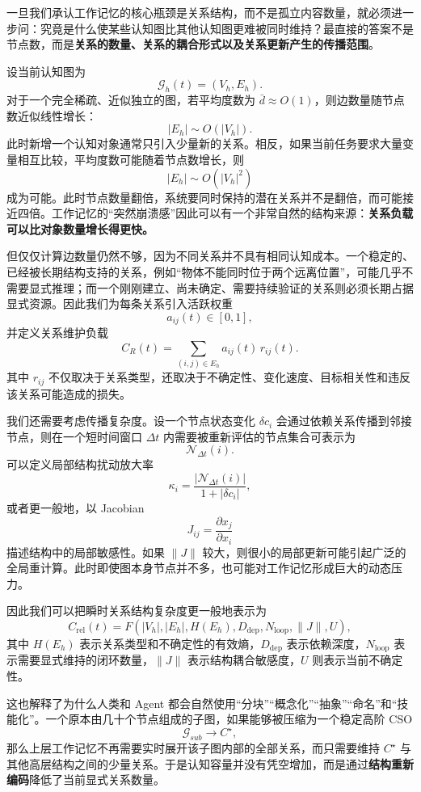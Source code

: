 一旦我们承认工作记忆的核心瓶颈是关系结构，而不是孤立内容数量，就必须进一步问：究竟是什么使某些认知图比其他认知图更难被同时维持？最直接的答案不是节点数，而是\textbf{关系的数量、关系的耦合形式以及关系更新产生的传播范围}。

设当前认知图为
\[
\mathcal{G}_h(t)=
\left(V_h,E_h\right).
\]
对于一个完全稀疏、近似独立的图，若平均度数为 $\bar d\approx O(1)$，则边数量随节点数近似线性增长：
\[
|E_h|
\sim
O(|V_h|).
\]
此时新增一个认知对象通常只引入少量新的关系。相反，如果当前任务要求大量变量相互比较，平均度数可能随着节点数增长，则
\[
|E_h|
\sim
O(|V_h|^2)
\]
成为可能。此时节点数量翻倍，系统要同时保持的潜在关系并不是翻倍，而可能接近四倍。工作记忆的“突然崩溃感”因此可以有一个非常自然的结构来源：\textbf{关系负载可以比对象数量增长得更快。}

但仅仅计算边数量仍然不够，因为不同关系并不具有相同认知成本。一个稳定的、已经被长期结构支持的关系，例如“物体不能同时位于两个远离位置”，可能几乎不需要显式推理；而一个刚刚建立、尚未确定、需要持续验证的关系则必须长期占据显式资源。因此我们为每条关系引入活跃权重
\[
a_{ij}(t)\in[0,1],
\]
并定义关系维护负载
\[
C_R(t)
=
\sum_{(i,j)\in E_h}
a_{ij}(t)\,r_{ij}(t).
\]
其中 $r_{ij}$ 不仅取决于关系类型，还取决于不确定性、变化速度、目标相关性和违反该关系可能造成的损失。

我们还需要考虑传播复杂度。设一个节点状态变化 $\delta c_i$ 会通过依赖关系传播到邻接节点，则在一个短时间窗口 $\Delta t$ 内需要被重新评估的节点集合可表示为
\[
\mathcal{N}_{\Delta t}(i).
\]
可以定义局部结构扰动放大率
\[
\kappa_i
=
\frac{
|\mathcal{N}_{\Delta t}(i)|
}{
1+|\delta c_i|
},
\]
或者更一般地，以 Jacobian
\[
J_{ij}
=
\frac{\partial x_j}{\partial x_i}
\]
描述结构中的局部敏感性。如果 $\|J\|$ 较大，则很小的局部更新可能引起广泛的全局重计算。此时即使图本身节点并不多，也可能对工作记忆形成巨大的动态压力。

因此我们可以把瞬时关系结构复杂度更一般地表示为
\[
C_{\mathrm{rel}}(t)
=
F\!\left(
|V_h|,
|E_h|,
H(E_h),
D_{\mathrm{dep}},
N_{\mathrm{loop}},
\|J\|,
U
\right),
\]
其中 $H(E_h)$ 表示关系类型和不确定性的有效熵，$D_{\mathrm{dep}}$ 表示依赖深度，$N_{\mathrm{loop}}$ 表示需要显式维持的闭环数量，$\|J\|$ 表示结构耦合敏感度，$U$ 则表示当前不确定性。

这也解释了为什么人类和 Agent 都会自然使用“分块”“概念化”“抽象”“命名”和“技能化”。一个原本由几十个节点组成的子图，如果能够被压缩为一个稳定高阶 CSO
\[
\mathcal{G}_{sub}
\longrightarrow
C^\star,
\]
那么上层工作记忆不再需要实时展开该子图内部的全部关系，而只需要维持 $C^\star$ 与其他高层结构之间的少量关系。于是认知容量并没有凭空增加，而是通过\textbf{结构重新编码}降低了当前显式关系数量。

